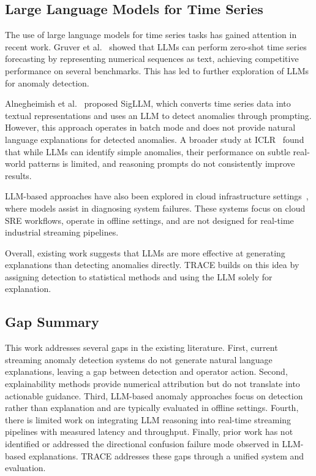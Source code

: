 \documentclass[11pt, a4paper]{article}
\begin{document}
\subsection{Large Language Models for Time Series}

The use of large language models for time series tasks has gained 
attention in recent work. Gruver et al.~\cite{gruver2024llmts} showed that 
LLMs can perform zero-shot time series forecasting by representing 
numerical sequences as text, achieving competitive performance on several 
benchmarks. This has led to further exploration of LLMs for anomaly 
detection.

Alnegheimish et al.~\cite{alnegheimish2023sigllm} proposed SigLLM, which 
converts time series data into textual representations and uses an LLM 
to detect anomalies through prompting. However, this approach operates 
in batch mode and does not provide natural language explanations for 
detected anomalies. A broader study at ICLR~\cite{openreview2024llmts} 
found that while LLMs can identify simple anomalies, their performance 
on subtle real-world patterns is limited, and reasoning prompts do not 
consistently improve results.

LLM-based approaches have also been explored in cloud infrastructure 
settings~\cite{jiang2023anomalyllm}, where models assist in diagnosing 
system failures. These systems focus on cloud SRE workflows, operate in 
offline settings, and are not designed for real-time industrial 
streaming pipelines.

Overall, existing work suggests that LLMs are more effective at generating 
explanations than detecting anomalies directly. TRACE builds on this idea 
by assigning detection to statistical methods and using the LLM solely 
for explanation.

\subsection{Gap Summary}

This work addresses several gaps in the existing literature. First, 
current streaming anomaly detection systems do not generate natural 
language explanations, leaving a gap between detection and operator 
action. Second, explainability methods provide numerical attribution 
but do not translate into actionable guidance. Third, LLM-based anomaly 
approaches focus on detection rather than explanation and are typically 
evaluated in offline settings. Fourth, there is limited work on integrating 
LLM reasoning into real-time streaming pipelines with measured latency 
and throughput. Finally, prior work has not identified or addressed the 
directional confusion failure mode observed in LLM-based explanations. 
TRACE addresses these gaps through a unified system and evaluation.
\end{document}
